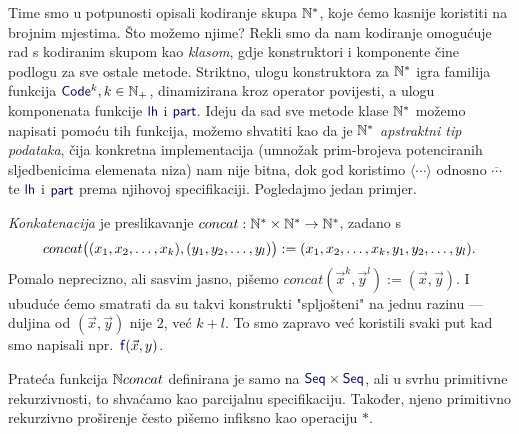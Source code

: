 Time smo u potpunosti opisali kodiranje skupa ${\mathbb N}^*$, koje ćemo kasnije koristiti na brojnim mjestima. Što možemo njime? Rekli smo da nam kodiranje omogućuje rad s kodiranim skupom kao \emph{klasom}, gdje konstruktori i komponente čine podlogu za sve ostale metode. Striktno, ulogu konstruktora za ${\mathbb N}^*$ igra familija funkcija $\f{Code}^k,k\in\N_+$, dinamizirana kroz operator povijesti, a ulogu komponenata funkcije $\f{lh}$ i $\f{part}$. Ideju da sad sve metode klase ${\mathbb N}^*$ možemo napisati pomoću tih funkcija, možemo shvatiti kao da je ${\mathbb N}^*$\! \emph{apstraktni tip podataka}, čija konkretna implementacija (umnožak prim-brojeva potenciranih sljedbenicima elemenata niza) nam nije bitna, dok god koristimo $\langle\cdots\rangle$ odnosno $\overline{\cdots}$ te $\f{lh}$ i $\f{part}$ prema njihovoj specifikaciji. Pogledajmo jedan primjer.

\begin{primjer}[{name=[konkatenacija konačnih nizova]}]\label{pr:concat}
\emph{Konkatenacija} je preslikavanje  $concat:{\mathbb N}^*\times{\mathbb N}^*\to{\mathbb N}^*$, zadano s
\begin{equation}
    concat\bigl((x_1,x_2,\dotsc,x_k),(y_1,y_2,\dotsc,y_l)\bigr):=(x_1,x_2,\dotsc,x_k,y_1,y_2,\dotsc,y_l)\text.
\end{equation}
Pomalo neprecizno, ali sasvim jasno, pišemo $concat(\vec x^k,\vec y^{l}):=(\vec x,\vec y)$. I ubuduće ćemo smatrati da su takvi konstrukti "spljošteni" na jednu razinu --- duljina od $(\vec x,\vec y)$ nije $2$, već $k+l$. To smo zapravo već koristili svaki put kad smo napisali npr.\ $\f{f}(\vec x,y)$.
\end{primjer}

Prateća funkcija ${\mathbb N} concat$ definirana je samo na $\f{Seq}\times\f{Seq}$, ali u svrhu primitivne rekurzivnosti, to shvaćamo kao parcijalnu specifikaciju. Također, njeno primitivno rekurzivno proširenje često pišemo infiksno kao operaciju $*$.

